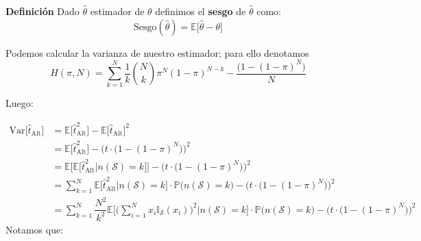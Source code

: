 \documentclass[
]{book}
\begin{document}
\textbf{Definición}
Dado \(\hat{\theta}\) estimador de \(\theta\) definimos el \textbf{sesgo} de \(\hat{\theta}\) como:
\[
\text{Sesgo}(\hat{\theta})= \mathbb{E}\Big[\hat{\theta} - \theta \Big]
\]

Podemos calcular la varianza de nuestro estimador; para ello denotamos
\[
H(\pi,N) = \sum\limits_{k = 1}^N \dfrac{1}{k}\binom{N}{k} \pi^N (1 - \pi)^{N - k} - \dfrac{\big( 1 - (1 - \pi)^N\big)}{N}
\]

Luego:

\begin{equation}\nonumber
\begin{aligned}
 \text{Var}\big[ \hat{t}_{\text{Alt}} \big] & = \mathbb{E}\big[ \hat{t}_{\text{Alt}}^2 \big] - \mathbb{E}\big[ \hat{t}_{\text{Alt}} \big]^2
 \\ & = \mathbb{E}\big[ \hat{t}_{\text{Alt}}^2 \big] - \Big( t \cdot \big( 1 - (1 - \pi)^N\big)\Big)^2
 \\ & = \mathbb{E}\Big[ \mathbb{E}\big[ \hat{t}_{\text{Alt}}^2 \big| n(\mathcal{S}) = k\big]\Big] - \Big( t \cdot \big( 1 - (1 - \pi)^N\big)\Big)^2
 \\ & = \sum\limits_{k = 1}^N \mathbb{E}\big[ \hat{t}_{\text{Alt}}^2 \big| n(\mathcal{S}) = k\big]\cdot \mathbb{P}\big(n(\mathcal{S}) = k\big) - \Big( t \cdot \big( 1 - (1 - \pi)^N\big)\Big)^2
 \\ & = \sum\limits_{k = 1}^N \dfrac{N^2}{k^2} \mathbb{E}\bigg[ \Big( \sum\limits_{i = 1}^N x_i \mathbb{I}_{\mathcal{S}}(x_i)\Big)^2 \bigg| n(\mathcal{S}) = k\bigg]\cdot \mathbb{P}\big(n(\mathcal{S}) = k\big) - \Big( t \cdot \big( 1 - (1 - \pi)^N\big)\Big)^2
\end{aligned}
\end{equation}
Notamos que:
\end{document}
